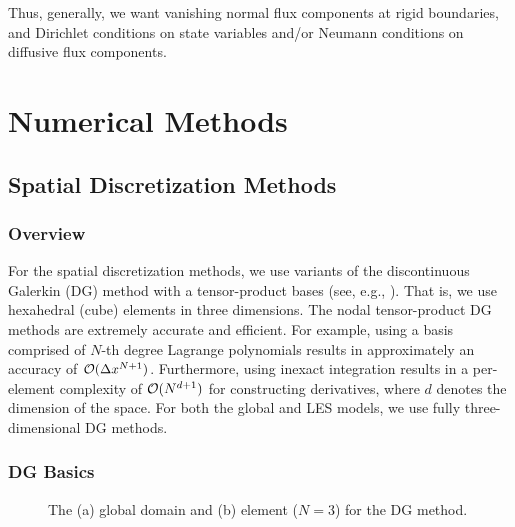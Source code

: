 \documentclass{article}
\begin{document}
Thus, generally, we want vanishing normal flux components at rigid boundaries, and Dirichlet conditions on state variables and/or Neumann conditions on diffusive flux components.

\section{Numerical Methods}
\label{sec:numerical_methods}

\subsection{Spatial Discretization Methods}

\subsubsection{Overview}
For the spatial discretization methods, we use variants of the discontinuous Galerkin (DG) method with a tensor-product bases (see, e.g., \citealt{giraldo:2008a, abdi:2016}). That is, we use hexahedral (cube) elements in three dimensions.  The nodal tensor-product DG methods are extremely accurate and efficient.  For example, using a basis comprised of $N$-th degree Lagrange polynomials results in approximately an accuracy of $\mathcal{O}(\Delta x^{N+1})$. Furthermore, using inexact integration results in a per-element complexity of $\mathcal{O}(N^{d+1})$ for constructing derivatives, where $d$ denotes the dimension of the space. For both the global and LES models, we use fully three-dimensional DG methods.

\subsubsection{DG Basics}

\begin{figure}[htbp]
\begin{center}
\end{center}
\caption{The (a) global domain and (b) element ($N=3$) for the DG method.}
\label{fig:spatial_discretization/dg_method}
\end{figure}
\end{document}
